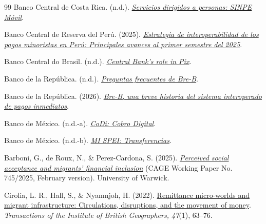 \documentclass[12pt]{article}
\begin{document}
\begin{thebibliography}{99}
Banco Central de Costa Rica. (n.d.). \href{https://www.bccr.fi.cr/cr/es/sistema-de-pagos/servicios-sinpe/servicios-dirigidos-a-personas.html}{\emph{Servicios dirigidos a personas: SINPE Móvil}}.

Banco Central de Reserva del Perú. (2025). \href{https://www.bcrp.gob.pe/docs/Sistema-Pagos/articulos/estrategia-de-interoperabilidad-2025-1.pdf}{\emph{Estrategia de interoperabilidad de los pagos minoristas en Perú: Principales avances al primer semestre del 2025}}.

Banco Central do Brasil. (n.d.). \href{https://www.bcb.gov.br/en/financialstability/pixcentralbanksrole}{\emph{Central Bank's role in Pix}}.

Banco de la República. (n.d.). \href{https://www.banrep.gov.co/es/bre-b/preguntas-frecuentes}{\emph{Preguntas frecuentes de Bre-B}}.

Banco de la República. (2026). \href{https://www.banrep.gov.co/es/blog/bre-b-breve-historia-sistema-interoperado-pagos-inmediatos}{\emph{Bre-B, una breve historia del sistema interoperado de pagos inmediatos}}.

Banco de México. (n.d.-a). \href{https://www.banxico.org.mx/sistemas-de-pago/codi-cobro-digital-banco-me.html}{\emph{CoDi: Cobro Digital}}.

Banco de México. (n.d.-b). \href{https://www.banxico.org.mx/servicios/mi-spei_-transferencias-ban.html}{\emph{MI SPEI: Transferencias}}.

Barboni, G., de Roux, N., \& Perez-Cardona, S. (2025). \href{https://warwick.ac.uk/fac/soc/economics/research/centres/cage/manage/publications/wp745.2025.pdf}{\emph{Perceived social acceptance and migrants' financial inclusion}} (CAGE Working Paper No. 745/2025, February version). University of Warwick.

Cirolia, L. R., Hall, S., \& Nyamnjoh, H. (2022). \href{https://doi.org/10.1111/tran.12467}{Remittance micro-worlds and migrant infrastructure: Circulations, disruptions, and the movement of money}. \emph{Transactions of the Institute of British Geographers, 47}(1), 63--76.


\end{thebibliography}
\end{document}
